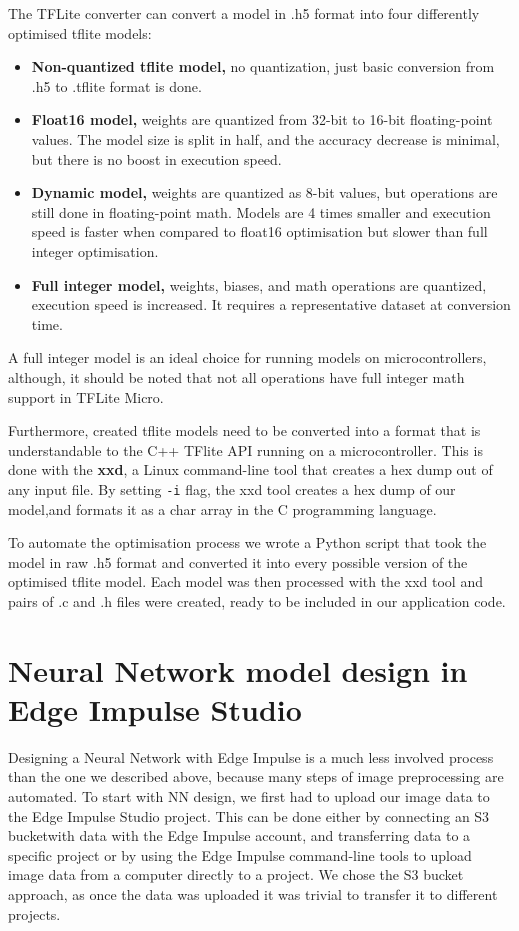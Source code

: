 The TFLite converter can convert a model in .h5 format into four differently optimised tflite models:
\begin{itemize}
    \item \textbf{Non-quantized tflite model,} no quantization, just basic conversion from .h5 to .tflite format is done.
    \item \textbf{Float16 model,} weights are quantized from 32-bit to 16-bit floating-point values. The model size is split in half, and the accuracy decrease is minimal, but there is no boost in execution speed.
    \item \textbf{Dynamic model,} weights are quantized as 8-bit values, but operations are still done in floating-point math. Models are 4 times smaller and execution speed is faster when compared to float16 optimisation but slower than full integer optimisation.
    \item \textbf{Full integer model,} weights, biases, and math operations are quantized, execution speed is increased. It requires a representative dataset at conversion time.
\end{itemize}

A full integer model is an ideal choice for running models on microcontrollers, although, it should be noted that not all operations have full integer math support in TFLite Micro.

Furthermore, created tflite models need to be converted into a format that is understandable to the C++ TFlite API running on a microcontroller.
This is done with the \textbf{xxd}, a Linux command-line tool that creates a hex dump out of any input file.
By setting \verb|-i| flag, the xxd tool creates a hex dump of our model,and formats it as a char array in the C programming language. 

To automate the optimisation process we wrote a Python script that took the model in raw .h5 format and converted it into every possible version of the optimised tflite model.
Each model was then processed with the xxd tool and pairs of .c and .h files were created, ready to be included in our application code.


\section{ Neural Network model design in Edge Impulse Studio}

Designing a Neural Network with Edge Impulse is a much less involved process than the one we described above, because many steps of image preprocessing are automated.
To start with NN design, we first had to upload our image data to the Edge Impulse Studio project.
This can be done either by connecting an S3 bucket\footnotemark with data with the Edge Impulse account, and transferring data to a specific project or by using the Edge Impulse command-line tools to upload image data from a computer directly to a project.
We chose the S3 bucket approach, as once the data was uploaded it was trivial to transfer it to different projects.

